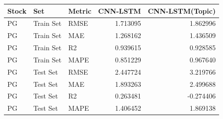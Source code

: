\begin{tabular}{lllrr}
\toprule
Stock & Set & Metric & CNN-LSTM & CNN-LSTM(Topic) \\
\midrule
PG & Train Set & RMSE & 1.713095 & 1.862996 \\
PG & Train Set & MAE & 1.268162 & 1.436509 \\
PG & Train Set & R2 & 0.939615 & 0.928585 \\
PG & Train Set & MAPE & 0.851229 & 0.967640 \\
PG & Test Set & RMSE & 2.447724 & 3.219766 \\
PG & Test Set & MAE & 1.893263 & 2.499688 \\
PG & Test Set & R2 & 0.263481 & -0.274406 \\
PG & Test Set & MAPE & 1.406452 & 1.869138 \\
\bottomrule
\end{tabular}
